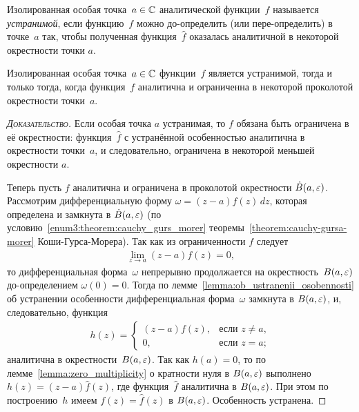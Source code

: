 \documentclass[../complex-analysis.tex]{subfiles}
\begin{document}
\begin{df}
 Изолированная особая точка~$ a \in \mathbb{C} $ аналитической функции~$ f $ называется \emph{устранимой}, если функцию~$ f $ можно до-определить (или пере-определить) в точке~$ a $ так, чтобы полученная функция~$ \hat f $ оказалась аналитичной в некоторой окрестности точки $ a $.
\end{df}
\begin{lm}
 Изолированная особая точка~$ a\in\mathbb{C} $ функции~$ f $ является устранимой, тогда и только тогда, когда функция~$ f $ аналитична и ограниченна в некоторой проколотой окрестности точки~$ a $.
\end{lm}
\begin{proof}[\normalfont\textsc{Доказательство}]
 Если особая точка $ a $ устранимая, то $ f $ обязана быть ограничена в её окрестности: функция~$ \hat f $ с устранённой особенностью аналитична в окрестности точки~$ a $, и следовательно, ограничена в некоторой меньшей окрестности $ a $.

 Теперь пусть $ f $ аналитична и ограничена в проколотой окрестности $ \dot B(a,\varepsilon) $. Рассмотрим дифференциальную форму $ \omega = (z-a) f(z)\,dz $, которая определена и замкнута в $ \dot B(a,\varepsilon) $ (по условию~\ref{enum3:theorem:cauchy_gurs_morer} теоремы~\ref{theorem:cauchy-gursa-morer} Коши-Гурса-Морера). Так как из ограниченности $ f $ следует
 \begin{align*}
  \lim_{z \to a} (z-a) f(z) = 0,
 \end{align*} то дифференциальная форма~$ \omega $ непрерывно продолжается на окрестность~$ B(a,\varepsilon) $ до-определением $ \omega(0) = 0 $. Тогда по лемме~\ref{lemma:ob_ustranenii_osobennosti} об устранении особенности дифференциальная форма~$ \omega $ замкнута в $ B(a,\varepsilon) $, и, следовательно, функция
 \begin{align*}
  h(z) = \begin{cases}
   (z-a) f(z), &\text{если } z \neq a,  \\
   0, &\text{если } z=a;
  \end{cases} 
 \end{align*} аналитична в окрестности~$ B(a,\varepsilon) $. Так как $ h(a) = 0 $, то по лемме~\ref{lemma:zero_multiplicity} о кратности нуля в $ B(a,\varepsilon) $ выполнено $ h(z) = (z-a) \hat f(z) $, где функция~$ \hat f $ аналитична в $ B(a,\varepsilon) $. При этом по построению~$ h $ имеем $ f(z) = \hat f(z) $ в $ B(a,\varepsilon) $. Особенность устранена.
\end{proof}
\end{document}
